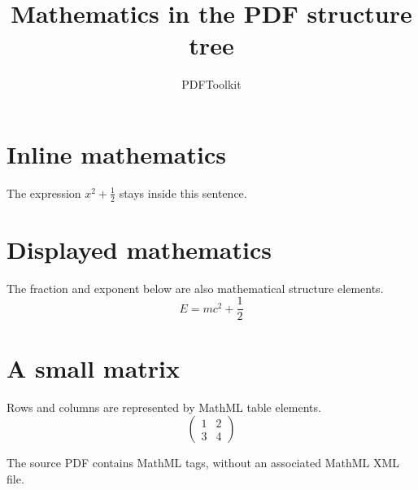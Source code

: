 \documentclass{article}
\title{Mathematics in the PDF structure tree}
\author{PDFToolkit}
\date{}
\begin{document}
\maketitle
\thispagestyle{empty}

\section{Inline mathematics}
The expression $x^{2}+\frac{1}{2}$ stays inside this sentence.

\section{Displayed mathematics}
The fraction and exponent below are also mathematical structure elements.
\[
E=mc^{2}+\frac{1}{2}
\]

\section{A small matrix}
Rows and columns are represented by MathML table elements.
\[
\begin{pmatrix}1&2\\3&4\end{pmatrix}
\]

The source PDF contains MathML tags, without an associated MathML XML file.
\end{document}
